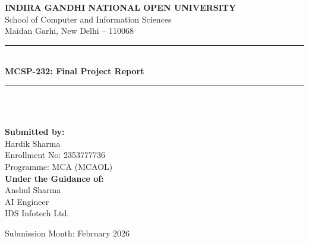 \begin{titlepage}
\centering
\vspace*{1.5cm}
{\Large \textbf{INDIRA GANDHI NATIONAL OPEN UNIVERSITY}}\\[0.3cm]
{\large School of Computer and Information Sciences}\\[0.3cm]
{\large Maidan Garhi, New Delhi -- 110068}\\[1.2cm]

\rule{\textwidth}{1.5pt}\\[0.4cm]
{\LARGE \textbf{MCSP-232: Final Project Report}}\\[0.3cm]
\rule{\textwidth}{1.5pt}\\[1.2cm]

{\Large \textbf{\projecttitle}}\\[1.5cm]

\begin{flushleft}
\textbf{Submitted by:}\\
Hardik Sharma\\
Enrollment No: 2353777736\\
Programme: MCA (MCAOL)\\[0.8cm]

\textbf{Under the Guidance of:}\\
Anshul Sharma\\
AI Engineer\\
IDS Infotech Ltd.\\
\end{flushleft}

\vfill
{\large Submission Month: February 2026}
\end{titlepage}
